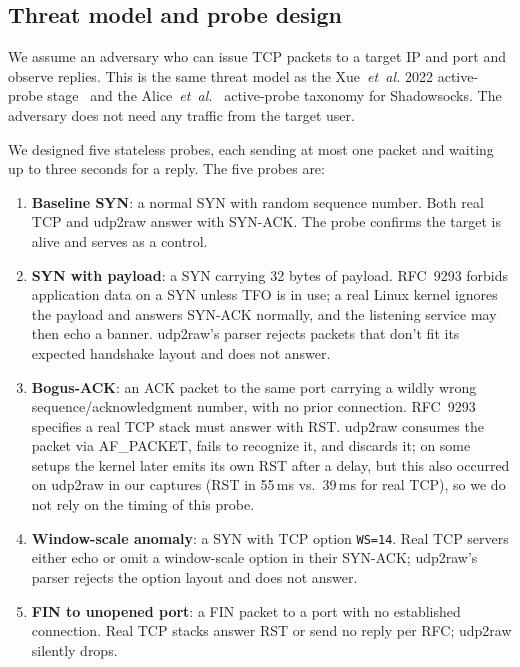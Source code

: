 \documentclass[conference]{IEEEtran}
\begin{document}
\subsection{Threat model and probe design}

We assume an adversary who can issue TCP packets to a target IP and port
and observe replies. This is the same threat model as the Xue~\textit{et~al.}
2022 active-probe stage~\cite{xue2022openvpn} and the
Alice~\textit{et~al.}~\cite{alice2020shadowsocks} active-probe taxonomy for
Shadowsocks. The adversary does not need any traffic from the target user.

We designed five stateless probes, each sending at most one packet and
waiting up to three seconds for a reply. The five probes are:

\begin{enumerate}
  \item[P1] \textbf{Baseline SYN}: a normal SYN with random sequence
        number. Both real TCP and udp2raw answer with SYN-ACK. The probe
        confirms the target is alive and serves as a control.
  \item[P2] \textbf{SYN with payload}: a SYN carrying 32 bytes of payload.
        RFC~9293 forbids application data on a SYN unless TFO is in use; a
        real Linux kernel ignores the payload and answers SYN-ACK normally,
        and the listening service may then echo a banner. udp2raw's parser
        rejects packets that don't fit its expected handshake layout
        and does not answer.
  \item[P3] \textbf{Bogus-ACK}: an ACK packet to the same port carrying
        a wildly wrong sequence/acknowledgment number, with no prior
        connection. RFC~9293 specifies a real TCP stack must answer with
        RST. udp2raw consumes the packet via AF\_PACKET, fails to recognize
        it, and discards it; on some setups the kernel later emits its own
        RST after a delay, but this also occurred on udp2raw in our
        captures (RST in 55\,ms vs.\ 39\,ms for real TCP), so we do not
        rely on the timing of this probe.
  \item[P4] \textbf{Window-scale anomaly}: a SYN with TCP option
        \texttt{WS=14}. Real TCP servers either echo or omit a
        window-scale option in their SYN-ACK; udp2raw's parser rejects
        the option layout and does not answer.
  \item[P5] \textbf{FIN to unopened port}: a FIN packet to a port with no
        established connection. Real TCP stacks answer RST or send no
        reply per RFC; udp2raw silently drops.
\end{enumerate}
\end{document}
